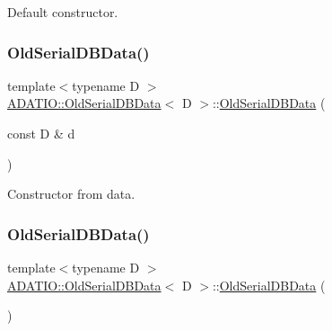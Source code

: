 Default constructor. 

\mbox{\label{classADATIO_1_1OldSerialDBData_ada293b92b5081fbb6e82364196ff5524}} 
\subsubsection{\texorpdfstring{OldSerialDBData()}{OldSerialDBData()}\hspace{0.1cm}{\footnotesize\ttfamily [2/6]}}
{\footnotesize\ttfamily template$<$typename D $>$ \\
\mbox{\hyperlink{classADATIO_1_1OldSerialDBData}{A\+D\+A\+T\+I\+O\+::\+Old\+Serial\+D\+B\+Data}}$<$ D $>$\+::\mbox{\hyperlink{classADATIO_1_1OldSerialDBData}{Old\+Serial\+D\+B\+Data}} (\begin{DoxyParamCaption}\item[{const D \&}]{d }\end{DoxyParamCaption})\hspace{0.3cm}{\ttfamily [inline]}}



Constructor from data. 

\mbox{\label{classADATIO_1_1OldSerialDBData_a189c0c4ac35db492b9cbc68deb15c5dd}} 
\subsubsection{\texorpdfstring{OldSerialDBData()}{OldSerialDBData()}\hspace{0.1cm}{\footnotesize\ttfamily [3/6]}}
{\footnotesize\ttfamily template$<$typename D $>$ \\
\mbox{\hyperlink{classADATIO_1_1OldSerialDBData}{A\+D\+A\+T\+I\+O\+::\+Old\+Serial\+D\+B\+Data}}$<$ D $>$\+::\mbox{\hyperlink{classADATIO_1_1OldSerialDBData}{Old\+Serial\+D\+B\+Data}} (\begin{DoxyParamCaption}{ }\end{DoxyParamCaption})\hspace{0.3cm}{\ttfamily [inline]}}



